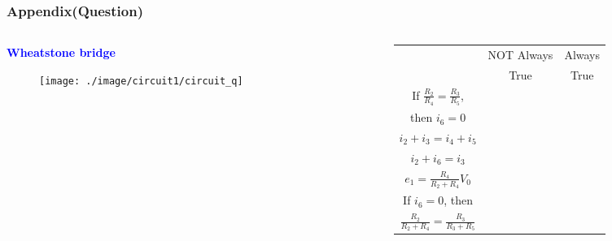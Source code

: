 \documentclass{beamer}
\newcommand{\blue}[1]{\textcolor{blue}{#1}}
\begin{document}
\begin{frame}
\frametitle{Appendix(Question)}
\begin{columns}
\begin{column}{4.5cm}
\blue{\bf Wheatstone bridge}

\begin{figure}[H]
  \centering
  \texttt{[image: ./image/circuit1/circuit\_q]}
\end{figure}
\end{column}


\begin{column}{8cm}
\begin{table}
\begin{center}
\def\arraystretch{1.5}

\begin{tabular}{|c|c|c|}
\hline
{} & NOT Always & Always \\ {} & True & True \\ 
\hline
If $\frac{R_2}{R_4} = \frac{R_3}{R_5}$, & {} & {} \\ 
then $i_6 = 0$    & {} & {} \\
\hline
$i_2 + i_3 = i_4 + i_5$  & {} & {} \\
\hline
$i_2 + i_6 = i_3$   & {} & {} \\
\hline
$e_1 = \frac{R_4}{R_2 + R_4}V_0$    & {} & {} \\
\hline
If $i_6 = 0$, then & {} & {} \\ $\frac{R_2}{R_2 + R_4} = \frac{R_3}{R_3 + R_5}$    & {} & {} \\
\hline
\end{tabular}
\end{center}
\end{table}


\end{column}
\end{columns}
\end{frame}

\end{document}
